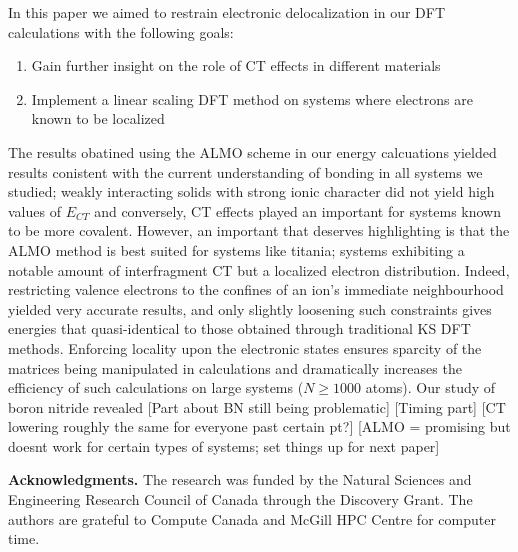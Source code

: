 \documentclass[aps,prb,twocolumn,amsmath,amssymb,superscriptaddress,longbibliography]{revtex4-1}
\begin{document}
In this paper we aimed to restrain electronic delocalization in our DFT calculations with the following goals:
\begin{enumerate}
\item{Gain further insight on the role of CT effects in different materials}
\item{Implement a linear scaling DFT method on systems where electrons are known to be localized}
\end{enumerate}
The results obatined using the ALMO scheme in our energy calcuations yielded results conistent with the current understanding of bonding in all systems we studied; weakly interacting solids with strong ionic character did not yield high values of $E_{CT}$ and conversely, CT effects played an important for systems known to be more covalent.
However, an important that deserves highlighting is that the ALMO method is best suited for systems like titania; systems exhibiting a notable amount of interfragment CT but a localized electron distribution. 
Indeed, restricting valence electrons to the confines of an ion's immediate neighbourhood yielded very accurate results, and only slightly loosening such constraints gives energies that quasi-identical to those obtained through traditional KS DFT methods. 
Enforcing locality upon the electronic states ensures sparcity of the matrices being manipulated in calculations and dramatically increases the efficiency of such calculations on large systems ($N\geq 1000$ atoms).
Our study of boron nitride revealed 
[Part about BN still being problematic]
[Timing part]
[CT lowering roughly the same for everyone past certain pt?]
[ALMO = promising but doesnt work for certain types of systems; set things up for next paper]



\textbf{Acknowledgments.} The research was funded by the Natural Sciences and Engineering Research Council of Canada through the Discovery Grant. The authors are grateful to Compute Canada and McGill HPC Centre for computer time.



%
\end{document}
